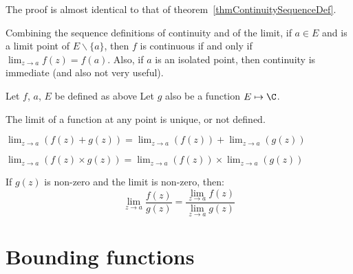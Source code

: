 \documentclass[../Main.tex]{subfiles}
\begin{document}
The proof is almost identical to that of theorem~\ref{thmContinuitySequenceDef}.\par
\begin{remark}
    Combining the sequence definitions of continuity and of the limit, if $a \in E$ and is a limit point of $E \backslash \{a\}$, then $f$ is continuous if and only if $\lim_{z \to a} f(z) = f(a)$. Also, if $a$ is an isolated point, then continuity is immediate (and also not very useful).
\end{remark}
\begin{propositions}{
        Let $f$, $a$, $E$ be defined as above Let $g$ also be a function $E \mapsto \C$.
        \label{propsLimitProperties}
    }
    \item The limit of a function at any point is unique, or not defined. \label{propLimitUnique}
    \item $\lim_{z \to a} (f(z) + g(z)) = \lim_{z \to a}(f(z)) + \lim_{z \to a} (g(z))$ \label{propLimitSum}
    \item $\lim_{z \to a} (f(z) \times g(z)) = \lim_{z \to a}(f(z)) \times \lim_{z \to a} (g(z))$ \label{propLimitProduct}
    \item If $g(z)$ is non-zero and the limit is non-zero, then:
        \begin{equation*}
            \lim_{z \to a} \frac{f(z)}{g(z)} = \frac{\lim_{z \to a} f(z)}{\lim_{z \to a} g(z)}
        \end{equation*}
\end{propositions}
\section{Bounding functions}
\end{document}

